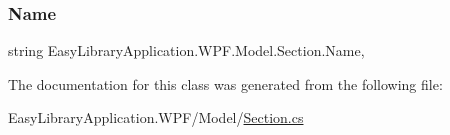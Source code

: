 \subsubsection{\texorpdfstring{Name}{Name}}
{\footnotesize\ttfamily string Easy\+Library\+Application.\+W\+P\+F.\+Model.\+Section.\+Name\hspace{0.3cm}{\ttfamily [get]}, {\ttfamily [set]}}



The documentation for this class was generated from the following file\+:\begin{DoxyCompactItemize}
\item 
Easy\+Library\+Application.\+W\+P\+F/\+Model/\mbox{\hyperlink{_section_8cs}{Section.\+cs}}\end{DoxyCompactItemize}
